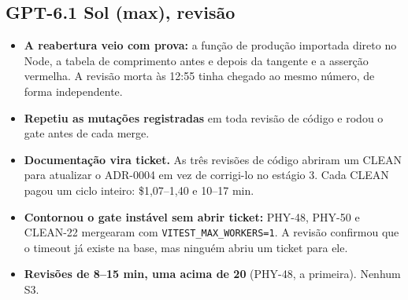 \documentclass[11pt,a4paper]{article}
\begin{document}
\subsection*{GPT-6.1 Sol (max), revisão}
\begin{itemize}
  \item \textbf{A reabertura veio com prova:} a função de produção importada
        direto no Node, a tabela de comprimento antes e depois da tangente e a
        asserção vermelha. A revisão morta às 12:55 tinha chegado ao mesmo
        número, de forma independente.
  \item \textbf{Repetiu as mutações registradas} em toda revisão de código e
        rodou o gate antes de cada merge.
  \item \textbf{Documentação vira ticket.} As três revisões de código abriram
        um CLEAN para atualizar o ADR-0004 em vez de corrigi-lo no estágio 3.
        Cada CLEAN pagou um ciclo inteiro: \$1,07--1,40 e 10--17 min.
  \item \textbf{Contornou o gate instável sem abrir ticket:} PHY-48, PHY-50 e
        CLEAN-22 mergearam com \texttt{VITEST\_MAX\_WORKERS=1}. A revisão
        confirmou que o timeout já existe na base, mas ninguém abriu um ticket
        para ele.
  \item \textbf{Revisões de 8--15 min, uma acima de 20} (PHY-48, a primeira).
        Nenhum S3.
\end{itemize}
\end{document}
